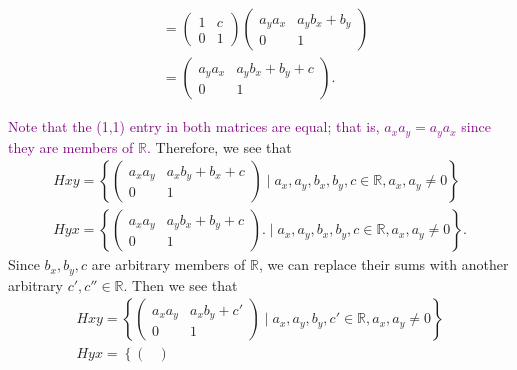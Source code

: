 \documentclass[12pt,letterpaper]{algebra_book}
\theoremstyle{definition}
\begin{document}
\begin{description}
\begin{minipage}{0.5\textwidth}
\begin{align*}
            &= 
            \begin{pmatrix}
                1 & c \\
                0 & 1    
            \end{pmatrix}
            \begin{pmatrix}
                a_ya_x & a_yb_x+ b_y \\
                0 & 1    
            \end{pmatrix}\\
            &= 
            \begin{pmatrix}
                a_ya_x & a_yb_x + b_y + c \\
                0 & 1    
            \end{pmatrix}.
        \end{align*}
    \end{minipage}
    \textcolor{purple}{Note that the (1,1) entry in both matrices are
    equal; that is, $a_xa_y = a_ya_x$ since they are members of
    $\mathbb{R}$.}
    Therefore, we see that 
    \begin{align*}
        Hxy = 
        \left\{ 
        \begin{pmatrix}
            a_xa_y & a_xb_y + b_x + c \\
            0 & 1    
        \end{pmatrix}
        \mid 
        a_x,a_y,b_x,b_y, c \in \mathbb{R}, a_x, a_y \ne 0
        \right \}\\
        Hyx = \left\{
        \begin{pmatrix}
            a_xa_y & a_yb_x + b_y + c \\
            0 & 1    
        \end{pmatrix}.
        \mid 
        a_x,a_y,b_x,b_y, c \in \mathbb{R}, a_x, a_y \ne 0
        \right\}.
    \end{align*}
    Since $b_x, b_y, c$ are arbitrary members of $\mathbb{R}$, we can
    replace their sums with another arbitrary $c', c'' \in \mathbb{R}$.
    Then we see that 
    \begin{align*}
        Hxy = 
        \left\{ 
        \begin{pmatrix}
            a_xa_y & a_xb_y +c' \\
            0 & 1    
        \end{pmatrix}
        \mid 
        a_x,a_y,b_y, c' \in \mathbb{R}, a_x, a_y \ne 0
        \right \}\\
        Hyx = \left\{
        \begin{pmatrix}

\end{pmatrix}
\end{align*}
\end{description}
\end{document}
